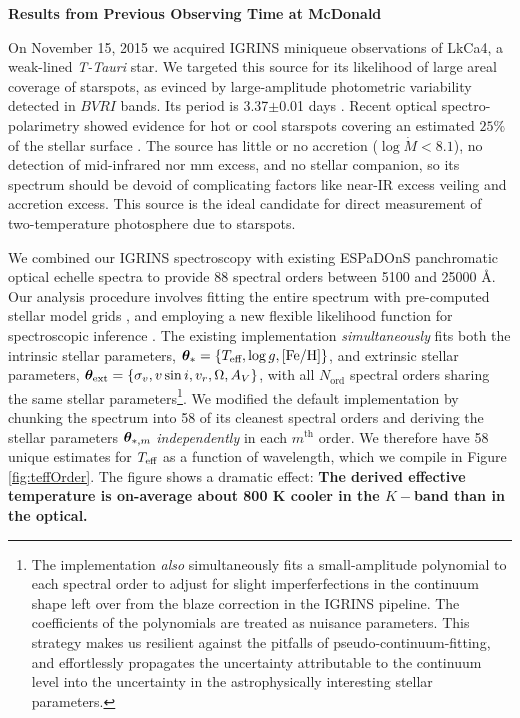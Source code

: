 \documentclass[11pt,aas_macros]{article}
\begin{document}
\newpage
\begin{center}{\bf Results from Previous Observing Time at McDonald}\end{center}

On November 15, 2015 we acquired IGRINS miniqueue observations of LkCa4, a weak-lined \emph{T-Tauri} star.  We targeted this source for its likelihood of large areal coverage of starspots, as evinced by large-amplitude photometric variability  detected in $BVRI$ bands.  Its period is 3.37$\pm$0.01 days \citep{1993AJ....106.1608V,1994IBVS.4042....1G}.  Recent optical spectro-polarimetry showed evidence for hot or cool starspots covering an estimated $25\%$ of the stellar surface \citep{2014MNRAS.444.3220D}.  The source has little or no accretion ($\log{\dot M} < 8.1$), no detection of mid-infrared nor mm excess, and no stellar companion, so its spectrum should be devoid of complicating factors like near-IR excess veiling and accretion excess.  This source is the ideal candidate for direct measurement of two-temperature photosphere due to starspots.

We combined our IGRINS spectroscopy with existing ESPaDOnS panchromatic optical echelle spectra to provide 88 spectral orders between 5100 and 25000 \AA.  Our analysis procedure involves fitting the entire spectrum with pre-computed stellar model grids \citep{2013A&A...553A...6H}, and employing a new flexible likelihood function for spectroscopic inference \citep{2015ApJ...812..128C}.  The existing implementation \emph{simultaneously} fits both the intrinsic stellar parameters, ${\bm \theta}_{\ast} = \{T_\textrm{eff}, \log g, [{\rm Fe}/{\rm H}] \}$, and extrinsic stellar parameters, ${\bm \theta}_{\rm ext} = \{\sigma_v, v \sin i, v_r, \Omega, A_V\}$, with all $N_{\mathrm{ord}}$ spectral orders sharing the same stellar parameters\footnote{The implementation \emph{also} simultaneously fits a small-amplitude polynomial to each spectral order to adjust for slight imperferfections in the continuum shape left over from the blaze correction in the IGRINS pipeline.  The coefficients of the polynomials are treated as nuisance parameters.  This strategy makes us resilient against the pitfalls of pseudo-continuum-fitting, and effortlessly propagates the uncertainty attributable to the continuum level into the uncertainty in the astrophysically interesting stellar parameters.}.  We modified the default implementation by chunking the spectrum into 58 of its cleanest spectral orders and deriving the stellar parameters ${\bm \theta}_{\ast,m}$ \emph{independently} in each $m^{\mathrm{th}}$ order.  We therefore have 58 unique estimates for $T_\textrm{eff}$ as a function of wavelength, which we compile in Figure \ref{fig:teffOrder}.  The figure shows a dramatic effect: \textbf{The derived effective temperature is on-average about 800 K cooler in the $K-$band than in the optical.}  
\end{document}
